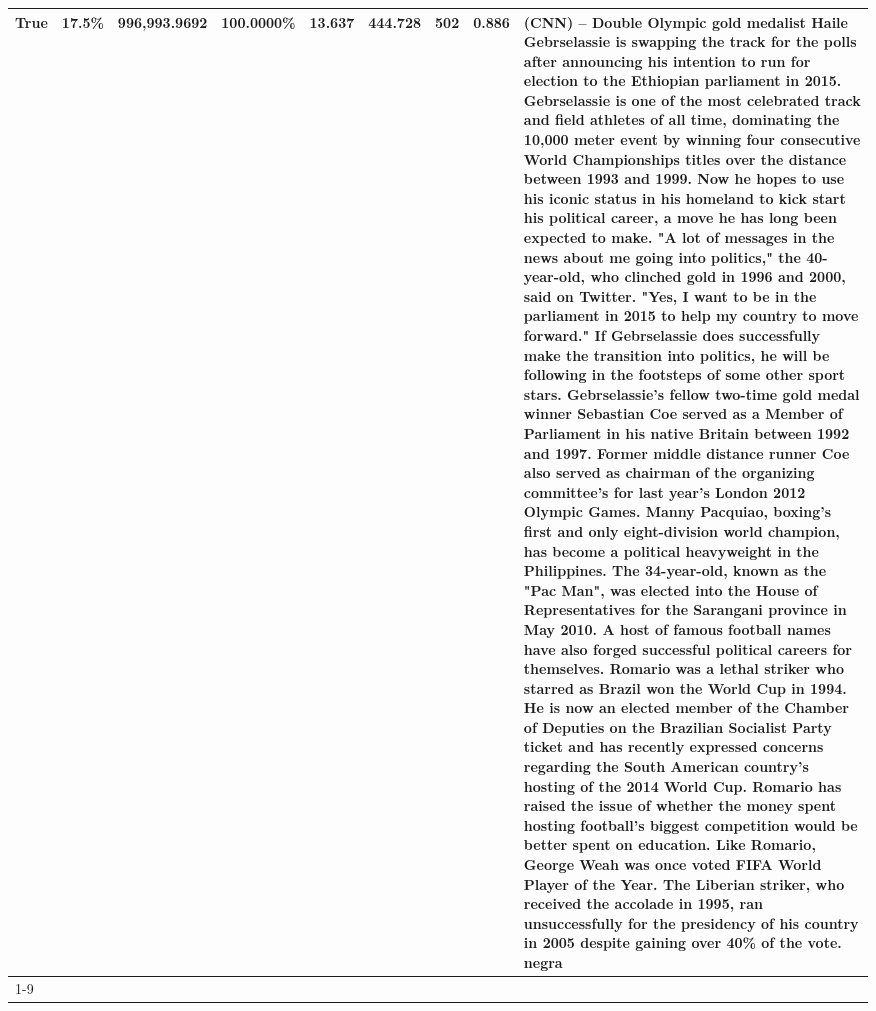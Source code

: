 \begin{table}[H]
{\begin{tabular}{lllrlllll}
True & 17.5\% & 996,993.9692 & \bfseries \color{red} 100.0000\% & 13.637 & 444.728 & 502 & 0.886 & (CNN) -- Double Olympic gold medalist Haile Gebrselassie is swapping the track for the polls after announcing his intention to run for election to the Ethiopian parliament in 2015. Gebrselassie is one of the most celebrated track and field athletes of all time, dominating the 10,000 meter event by winning four consecutive World Championships titles over the distance between 1993 and 1999. Now he hopes to use his iconic status in his homeland to kick start his political career, a move he has long been expected to make. "A lot of messages in the news about me going into politics," the 40-year-old, who clinched gold in 1996 and 2000, said on Twitter. "Yes, I want to be in the parliament in 2015 to help my country to move forward." If Gebrselassie does successfully make the transition into politics, he will be following in the footsteps of some other sport stars. Gebrselassie's fellow two-time gold medal winner Sebastian Coe served as a Member of Parliament in his native Britain between 1992 and 1997. Former middle distance runner Coe also served as chairman of the organizing committee's for last year's London 2012 Olympic Games. Manny Pacquiao, boxing's first and only eight-division world champion, has become a political heavyweight in the Philippines. The 34-year-old, known as the "Pac Man", was elected into the House of Representatives for the Sarangani province in May 2010. A host of famous football names have also forged successful political careers for themselves. Romario was a lethal striker who starred as Brazil won the World Cup in 1994. He is now an elected member of the Chamber of Deputies on the Brazilian Socialist Party ticket and has recently expressed concerns regarding the South American country's hosting of the 2014 World Cup. Romario has raised the issue of whether the money spent hosting football's biggest competition would be better spent on education. Like Romario, George Weah was once voted FIFA World Player of the Year. The Liberian striker, who received the accolade in 1995, ran unsuccessfully for the presidency of his country in 2005 despite gaining over 40\% of the vote. negra \\
\cline{1-9}

\end{tabular}}
\end{table}
